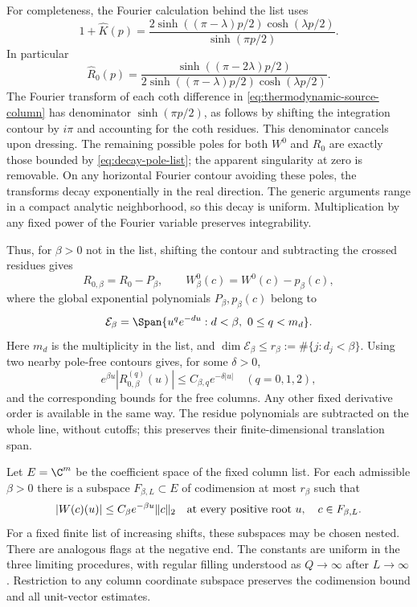 For completeness, the Fourier calculation behind the list uses
\[
 1+\widehat K(p)
 =\frac{2\sinh((\pi-\lambda)p/2)\cosh(\lambda p/2)}
        {\sinh(\pi p/2)}.
\]
In particular
\[
 \widehat R_0(p)=
 \frac{\sinh((\pi-2\lambda)p/2)}
      {2\sinh((\pi-\lambda)p/2)\cosh(\lambda p/2)}.
\]
The Fourier transform of each coth difference in
\eqref{eq:thermodynamic-source-column} has denominator
$\sinh(\pi p/2)$, as follows by shifting the integration contour
by $i\pi$ and accounting for the coth residues.
This denominator cancels upon dressing.  The remaining possible
poles for both $W^0$ and $R_0$ are exactly those bounded by
\eqref{eq:decay-pole-list}; the apparent singularity at zero is
removable.  On any horizontal Fourier contour avoiding these
poles, the transforms decay exponentially in the real direction.
The generic arguments range in a compact analytic neighborhood,
so this decay is uniform.  Multiplication by any fixed power of
the Fourier variable preserves integrability.

Thus, for $\beta>0$ not in the list, shifting the contour and
subtracting the crossed residues gives
\[
 R_{0,\beta}=R_0-P_\beta,\qquad
 W^0_\beta(c)=W^0(c)-p_\beta(c),
\]
where the global exponential polynomials $P_\beta,p_\beta(c)$
belong to
\begin{equation}\label{eq:residue-space}
 \mathcal E_\beta
 =\Span\{u^q e^{-du}:d<\beta,\ 0\le q<m_d\}.
\end{equation}
Here $m_d$ is the multiplicity in the list, and
$\dim\mathcal E_\beta\le r_\beta:=\#\{j:d_j<\beta\}$.
Using two nearby pole-free contours gives, for some $\delta>0$,
\begin{equation}\label{eq:shifted-kernel-envelope}
 e^{\beta u}|R_{0,\beta}^{(q)}(u)|
       \le C_{\beta,q}e^{-\delta|u|}
 \quad(q=0,1,2),
\end{equation}
and the corresponding bounds for the free columns.
Any other fixed derivative order is available in the same way.
The residue polynomials are subtracted on the whole line, without
cutoffs; this preserves their finite-dimensional translation span.

\begin{lemma}\label{lem:weighted-flags}
Let $E=\C^m$ be the coefficient space of the fixed column list.
For each admissible $\beta>0$ there is a subspace
$F_{\beta,L}\subset E$ of codimension at most $r_\beta$
such that
\begin{equation}\label{eq:weighted-node-decay}
 |W(c)(u)|\le C_\beta e^{-\beta u}\|c\|_2
 \quad\hbox{at every positive root }u,\quad c\in F_{\beta,L}.
\end{equation}
For a fixed finite list of increasing shifts, these subspaces may
be chosen nested.  There are analogous flags at the negative end.
The constants are uniform in the three limiting procedures,
with regular filling understood as $Q\to\infty$ after $L\to\infty$.
Restriction to any column coordinate subspace preserves the
codimension bound and all unit-vector estimates.
\end{lemma}

